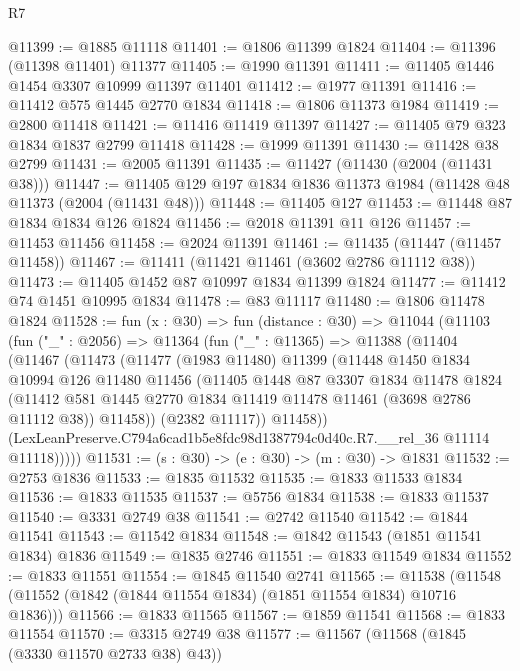 \begin{lexlean}{R7}
\begin{coremodule}
@11399 := @1885 @11118
@11401 := @1806 @11399 @1824
@11404 := @11396 (@11398 @11401) @11377
@11405 := @1990 @11391
@11411 := @11405 @1446 @1454 @3307 @10999 @11397 @11401
@11412 := @1977 @11391
@11416 := @11412 @575 @1445 @2770 @1834
@11418 := @1806 @11373 @1984
@11419 := @2800 @11418
@11421 := @11416 @11419 @11397
@11427 := @11405 @79 @323 @1834 @1837 @2799 @11418
@11428 := @1999 @11391
@11430 := @11428 @38 @2799
@11431 := @2005 @11391
@11435 := @11427 (@11430 (@2004 (@11431 @38)))
@11447 := @11405 @129 @197 @1834 @1836 @11373 @1984 (@11428 @48 @11373 (@2004 (@11431 @48)))
@11448 := @11405 @127
@11453 := @11448 @87 @1834 @1834 @126 @1824
@11456 := @2018 @11391 @11 @126
@11457 := @11453 @11456
@11458 := @2024 @11391
@11461 := @11435 (@11447 (@11457 @11458))
@11467 := @11411 (@11421 @11461 (@3602 @2786 @11112 @38))
@11473 := @11405 @1452 @87 @10997 @1834 @11399 @1824
@11477 := @11412 @74 @1451 @10995 @1834
@11478 := @83 @11117
@11480 := @1806 @11478 @1824
@11528 := fun (x : @30) =>
  fun (distance : @30) =>
  @11044
    (@11103
      (fun ("_" : @2056) =>
      @11364
        (fun ("_" : @11365) =>
        @11388
          (@11404
            (@11467
              (@11473
                (@11477
                  (@1983 @11480)
                  @11399
                  (@11448
                    @1450
                    @1834
                    @10994
                    @126
                    @11480
                    @11456
                    (@11405
                      @1448
                      @87
                      @3307
                      @1834
                      @11478
                      @1824
                      (@11412 @581 @1445 @2770 @1834 @11419 @11478 @11461 (@3698 @2786 @11112 @38))
                      @11458))
                  (@2382 @11117))
                @11458))
            (LexLeanPreserve.C794a6cad1b5e8fdc98d1387794c0d40c.R7.__rel_36 @11114 @11118)))))
@11531 := (s : @30) -> (e : @30) -> (m : @30) -> @1831
@11532 := @2753 @1836
@11533 := @1835 @11532
@11535 := @1833 @11533 @1834
@11536 := @1833 @11535
@11537 := @5756 @1834
@11538 := @1833 @11537
@11540 := @3331 @2749 @38
@11541 := @2742 @11540
@11542 := @1844 @11541
@11543 := @11542 @1834
@11548 := @1842 @11543 (@1851 @11541 @1834) @1836
@11549 := @1835 @2746
@11551 := @1833 @11549 @1834
@11552 := @1833 @11551
@11554 := @1845 @11540 @2741
@11565 := @11538 (@11548 (@11552 (@1842 (@1844 @11554 @1834) (@1851 @11554 @1834) @10716 @1836)))
@11566 := @1833 @11565
@11567 := @1859 @11541
@11568 := @1833 @11554
@11570 := @3315 @2749 @38
@11577 := @11567 (@11568 (@1845 (@3330 @11570 @2733 @38) @43))

\end{coremodule}
\end{lexlean}
